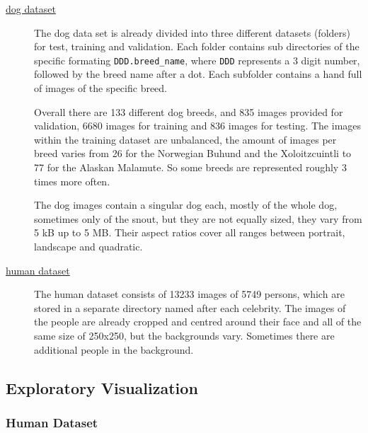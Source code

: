 \documentclass[paper=A4, DIV=10, parskip=half]{scrartcl}
\begin{document}
\begin{description}
  \item[\href{https://s3-us-west-1.amazonaws.com/udacity-aind/dog-project/dogImages.zip}{dog dataset}]
  The dog data set is already divided into three different datasets (folders)
  for test, training and validation. Each folder contains sub directories of the specific
  formating \texttt{DDD.breed\_name}, where \texttt{DDD} represents a 3 digit number,
  followed by the breed name after a dot. Each subfolder contains a hand full of images of
  the specific breed.
  
  Overall there are 133 different dog breeds, and 835 images provided for validation, 6680
  images for training and 836 images for testing. The images within the training dataset
  are unbalanced, the amount of images per breed varies from 26 for the Norwegian Buhund
  and the Xoloitzcuintli to 77 for the Alaskan Malamute. So some breeds are represented
  roughly 3 times more often.
  
  The dog images contain a singular dog each, mostly of the whole dog, sometimes only of
  the snout, but they are not equally sized, they vary from 5 kB up to 5 MB. Their aspect
  ratios cover all ranges between portrait, landscape and quadratic.
  
  \item[\href{https://s3-us-west-1.amazonaws.com/udacity-aind/dog-project/lfw.zip}{human dataset}]
  The human dataset consists of 13233 images of 5749 persons, which are stored in a
  separate directory named after each  celebrity. The images of the people are already
  cropped and centred around their face and all of the same size of 250x250, but
  the backgrounds vary. Sometimes there are additional people in the background.
\end{description}


\subsection*{Exploratory Visualization}

\subsubsection*{Human Dataset}
\end{document}
